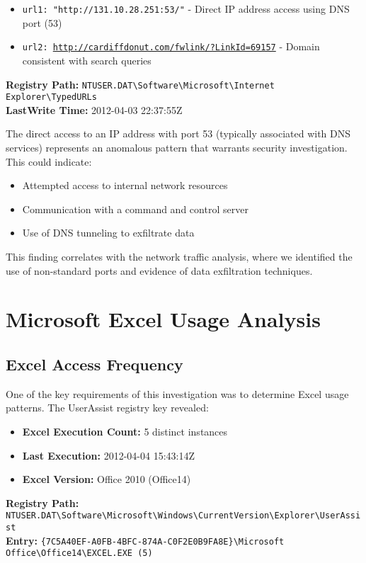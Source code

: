 \begin{itemize}
    \item \texttt{url1: "http://131.10.28.251:53/"} - Direct IP address access using DNS port (53)
    \item \texttt{url2: \url{http://cardiffdonut.com/fwlink/?LinkId=69157}} - Domain consistent with search queries
\end{itemize}

\textbf{Registry Path:} \texttt{NTUSER.DAT\textbackslash Software\textbackslash Microsoft\textbackslash Internet Explorer\textbackslash TypedURLs}\\
\textbf{LastWrite Time:} 2012-04-03 22:37:55Z

The direct access to an IP address with port 53 (typically associated with DNS services) represents an anomalous pattern that warrants security investigation. This could indicate:
\begin{itemize}
    \item Attempted access to internal network resources
    \item Communication with a command and control server
    \item Use of DNS tunneling to exfiltrate data
\end{itemize}

This finding correlates with the network traffic analysis, where we identified the use of non-standard ports and evidence of data exfiltration techniques.

\section{Microsoft Excel Usage Analysis}
\subsection{Excel Access Frequency}
One of the key requirements of this investigation was to determine Excel usage patterns. The UserAssist registry key revealed:

\begin{itemize}
    \item \textbf{Excel Execution Count:} 5 distinct instances
    \item \textbf{Last Execution:} 2012-04-04 15:43:14Z
    \item \textbf{Excel Version:} Office 2010 (Office14)
\end{itemize}

\textbf{Registry Path:} \texttt{NTUSER.DAT\textbackslash Software\textbackslash Microsoft\textbackslash Windows\textbackslash CurrentVersion\textbackslash Explorer\textbackslash UserAssist}\\
\textbf{Entry:} \texttt{\{7C5A40EF-A0FB-4BFC-874A-C0F2E0B9FA8E\}\textbackslash Microsoft Office\textbackslash Office14\textbackslash EXCEL.EXE (5)}

